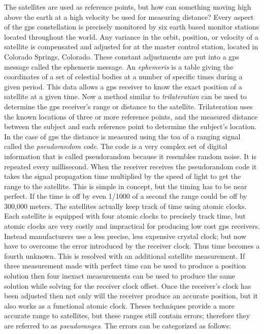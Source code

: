 The satellites are used as reference points, but how can something moving high above the earth at a high velocity be used for measuring distance?  Every aspect of the \ac{gps} constellation is precisely monitored by six earth based monitor stations located throughout the world.  Any variance in the orbit, position, or velocity of a satellite is compensated and adjusted for at the master control station, located in Colorado Springs, Colorado.  These constant adjustments are put into a \ac{gps} message called the ephemeris message.  An \textit{ephemeris} is a table giving the coordinates of a set of celestial bodies at a number of specific times during a given period.  This data allows a \ac{gps} receiver to know the exact position of a satellite at a given time.  Now a method similar to \textit{trilateration} can be used to determine the \ac{gps} receiver's range or distance to the satellite. Trilateration uses the known locations of three or more reference points, and the measured distance between the subject and each reference point to determine the subject's location. In the case of \ac{gps} the distance is measured using the \ac{toa} of a ranging signal called the \textit{pseudorandom code}. The code is a very complex set of digital information that is called pseudorandom because it resembles random noise. It is repeated every millisecond. When the receiver receives the pseudorandom code it takes the signal propagation time multiplied by the speed of light to get the range to the satellite.  This is simple in concept, but the timing has to be near perfect.  If the time is off by even 1/1000 of a second the range could be off by 300,000 meters.  The satellites actually keep track of time using atomic clocks.  Each satellite is equipped with four atomic clocks to precisely track time, but atomic clocks are very costly and impractical for producing low cost \ac{gps} receivers.  Instead manufacturers use a less precise, less expensive crystal clock; but now have to overcome the error introduced by the receiver clock. Thus time becomes a fourth unknown. This is resolved with an additional satellite measurement. If three measurement made with perfect time can be used to produce a position solution then four inexact measurements can be used to produce the same solution while solving for the receiver clock offset.  Once the receiver's clock has been adjusted then not only will the receiver produce an accurate position, but it also works as a functional atomic clock.  Theses techniques provide a more accurate range to satellites, but these ranges still contain errors; therefore they are referred to as \textit{pseudoranges}.  The errors can be categorized as follows:

